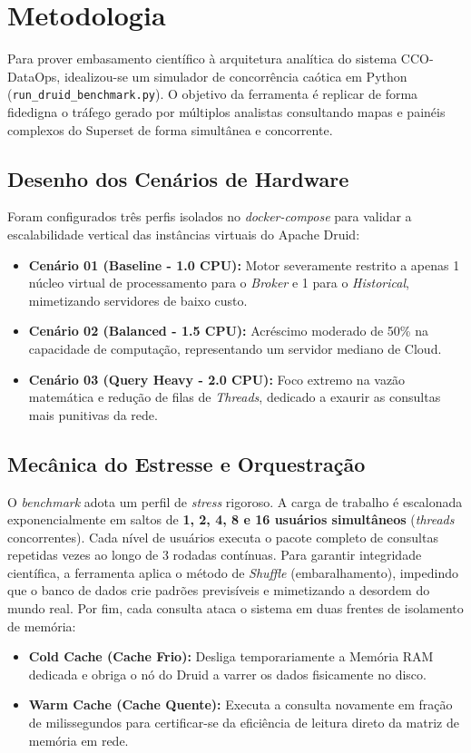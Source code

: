 \section{Metodologia}

Para prover embasamento científico à arquitetura analítica do sistema CCO-DataOps, idealizou-se um simulador de concorrência caótica em Python (\texttt{run\_druid\_benchmark.py}). O objetivo da ferramenta é replicar de forma fidedigna o tráfego gerado por múltiplos analistas consultando mapas e painéis complexos do Superset de forma simultânea e concorrente.

\subsection{Desenho dos Cenários de Hardware}
Foram configurados três perfis isolados no \textit{docker-compose} para validar a escalabilidade vertical das instâncias virtuais do Apache Druid:
\begin{itemize}
    \item \textbf{Cenário 01 (Baseline - 1.0 CPU):} Motor severamente restrito a apenas 1 núcleo virtual de processamento para o \textit{Broker} e 1 para o \textit{Historical}, mimetizando servidores de baixo custo.
    \item \textbf{Cenário 02 (Balanced - 1.5 CPU):} Acréscimo moderado de 50\% na capacidade de computação, representando um servidor mediano de Cloud.
    \item \textbf{Cenário 03 (Query Heavy - 2.0 CPU):} Foco extremo na vazão matemática e redução de filas de \textit{Threads}, dedicado a exaurir as consultas mais punitivas da rede.
\end{itemize}

\subsection{Mecânica do Estresse e Orquestração}
O \textit{benchmark} adota um perfil de \textit{stress} rigoroso. A carga de trabalho é escalonada exponencialmente em saltos de \textbf{1, 2, 4, 8 e 16 usuários simultâneos} (\textit{threads} concorrentes). 
Cada nível de usuários executa o pacote completo de consultas repetidas vezes ao longo de 3 rodadas contínuas. Para garantir integridade científica, a ferramenta aplica o método de \textit{Shuffle} (embaralhamento), impedindo que o banco de dados crie padrões previsíveis e mimetizando a desordem do mundo real.
Por fim, cada consulta ataca o sistema em duas frentes de isolamento de memória:
\begin{itemize}
    \item \textbf{Cold Cache (Cache Frio):} Desliga temporariamente a Memória RAM dedicada e obriga o nó do Druid a varrer os dados fisicamente no disco.
    \item \textbf{Warm Cache (Cache Quente):} Executa a consulta novamente em fração de milissegundos para certificar-se da eficiência de leitura direto da matriz de memória em rede.
\end{itemize}


